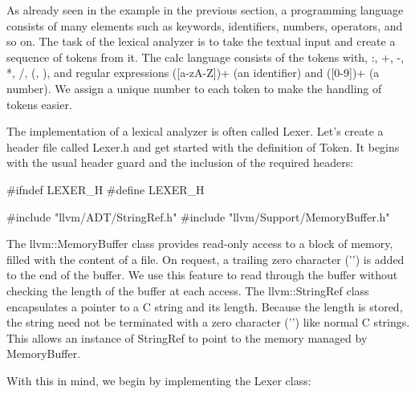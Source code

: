 As already seen in the example in the previous section, a programming language consists of many elements such as keywords, identifiers, numbers, operators, and so on. The task of the lexical analyzer is to take the textual input and create a sequence of tokens from it. The calc language consists of the tokens with, :, +, -, *, /, (, ), and regular expressions ([a-zA-Z])+ (an identifier) and ([0-9])+ (a number). We assign a unique number to each token to make the handling of tokens easier.


The implementation of a lexical analyzer is often called Lexer. Let’s create a header file called Lexer.h and get started with the definition of Token. It begins with the usual header guard and the inclusion of the required headers:

\begin{cpp}
#ifndef LEXER_H
#define LEXER_H

#include "llvm/ADT/StringRef.h"
#include "llvm/Support/MemoryBuffer.h"
\end{cpp}

The llvm::MemoryBuffer class provides read-only access to a block of memory, filled with the content of a file. On request, a trailing zero character ('') is added to the end of the buffer. We use this feature to read through the buffer without checking the length of the buffer at each access. The llvm::StringRef class encapsulates a pointer to a C string and its length. Because the length is stored, the string need not be terminated with a zero character ('') like normal C strings. This allows an instance of StringRef to point to the memory managed by MemoryBuffer.

With this in mind, we begin by implementing the Lexer class:

